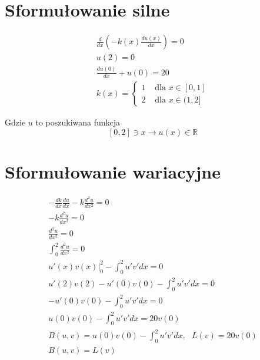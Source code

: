 \documentclass{article}
\begin{document}
\section{Sformułowanie silne}
$$
\begin{gathered}
    \frac{d}{d x}\left(-k(x) \frac{d u(x)}{d x}\right)=0 \\
    u(2)=0 \\
    \frac{d u(0)}{d x}+u(0)=20 \\
k(x)= \begin{cases}1 & \text { dla } x \in[0,1] \\
    2 & \text { dla } x \in(1,2]\end{cases}
\end{gathered}
$$

Gdzie $u$ to poszukiwana funkcja
$$
[0,2] \ni x \rightarrow u(x) \in \mathbb{R}
$$

\section{Sformułowanie wariacyjne}
$$
\begin{gathered}
-\frac{dk}{dx}\frac{du}{dx} - k\frac{d^2u}{dx^2} = 0\\
- k\frac{d^2u}{dx^2} = 0\\
\frac{d^2u}{dx^2} = 0\\
\int_0^2\frac{d^2u}{dx^2} = 0\\
u'(x)v(x)\big\rvert^2_0 - \int_0^2u'v'dx = 0\\
u'(2)v(2) - u'(0)v(0) - \int_0^2u'v'dx = 0\\
- u'(0)v(0) - \int_0^2u'v'dx = 0\\
u(0)v(0) - \int_0^2u'v'dx = 20v(0)\\
B(u,v ) = u(0)v(0) - \int_0^2u'v'dx, \text{ } L(v) = 20v(0)\\
B(u, v) = L(v)\\
\end{gathered}
$$
\end{document}
